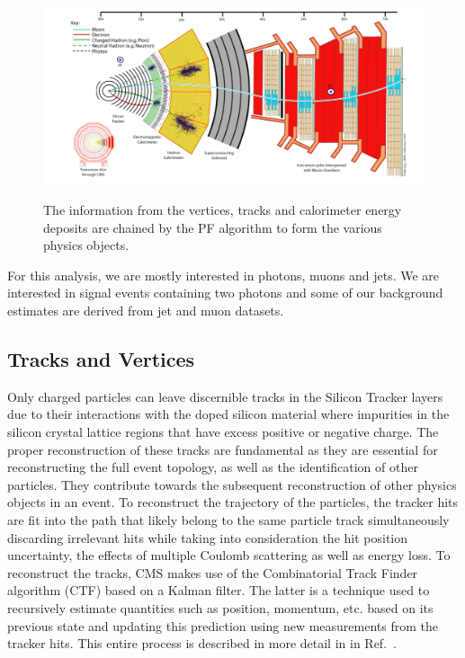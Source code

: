 \begin{figure}[!htbp]
	\centering
     \caption{The information from the vertices, tracks and calorimeter energy deposits are chained by the PF algorithm to form the various physics objects.}
	\includegraphics[scale=0.6]{fig/CMSParticleFlow.png}
	\label{fig:CMSParticleFlow}
\end{figure}

For this analysis, we are mostly interested in photons, muons and jets. We are interested in signal events containing two photons and some of our background estimates are derived from jet and muon datasets. 


\subsection{Tracks and Vertices}\label{sec:track_vertex}

Only charged particles can leave discernible tracks in the Silicon Tracker layers due to their interactions with the doped silicon material where impurities in the silicon crystal lattice regions that have excess positive or negative charge. The proper reconstruction of these tracks are fundamental as they are essential for reconstructing the full event topology, as well as the identification of other particles. They contribute towards the subsequent reconstruction of other physics objects in an event. To reconstruct the trajectory of the particles, the tracker hits are fit into the path that likely belong to the same particle track simultaneously discarding irrelevant hits while taking into consideration the hit position uncertainty, the effects of multiple Coulomb scattering as well as energy loss. To reconstruct the tracks, CMS makes use of the Combinatorial Track Finder algorithm (CTF) based on a Kalman filter. The latter is a technique used to recursively estimate quantities such as position, momentum, etc. based on its previous state and updating this prediction using new measurements from the tracker hits. This entire process is described in more detail in in Ref.~\cite{Chatrchyan:2014fea}.


